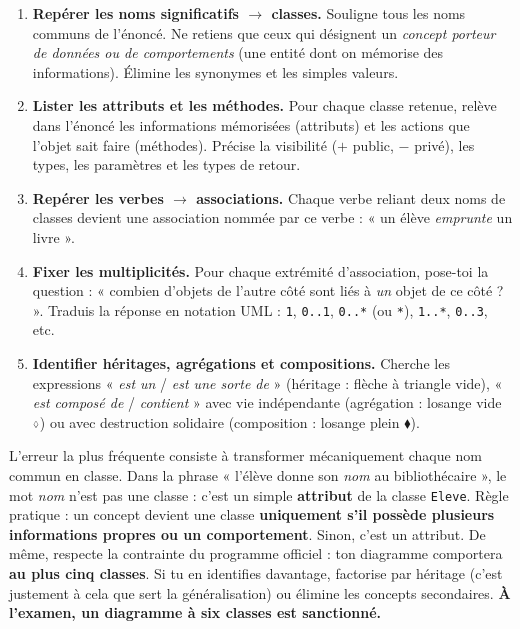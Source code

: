 \documentclass[11pt]{article}
\def\diamond{\mathbin{\scalebox{0.6}{$\Diamond$}}}%
\begin{document}
\begin{methode}
\begin{enumerate}
  \item \textbf{Repérer les noms significatifs $\rightarrow$ classes.} Souligne tous les noms communs de l'énoncé. Ne retiens que ceux qui désignent un \emph{concept porteur de données ou de comportements} (une entité dont on mémorise des informations). Élimine les synonymes et les simples valeurs.
  \item \textbf{Lister les attributs et les méthodes.} Pour chaque classe retenue, relève dans l'énoncé les informations mémorisées (attributs) et les actions que l'objet sait faire (méthodes). Précise la visibilité ($+$ public, $-$ privé), les types, les paramètres et les types de retour.
  \item \textbf{Repérer les verbes $\rightarrow$ associations.} Chaque verbe reliant deux noms de classes devient une association nommée par ce verbe : « un élève \emph{emprunte} un livre ».
  \item \textbf{Fixer les multiplicités.} Pour chaque extrémité d'association, pose-toi la question : « combien d'objets de l'autre côté sont liés à \emph{un} objet de ce côté ? ». Traduis la réponse en notation UML : \texttt{1}, \texttt{0..1}, \texttt{0..*} (ou \texttt{*}), \texttt{1..*}, \texttt{0..3}, etc.
  \item \textbf{Identifier héritages, agrégations et compositions.} Cherche les expressions « \emph{est un} / \emph{est une sorte de} » (héritage : flèche à triangle vide), « \emph{est composé de} / \emph{contient} » avec vie indépendante (agrégation : losange vide $\diamond$) ou avec destruction solidaire (composition : losange plein $\blacklozenge$).
\end{enumerate}
\end{methode}

\begin{attention}
L'erreur la plus fréquente consiste à transformer mécaniquement chaque nom commun en classe. Dans la phrase « l'élève donne son \emph{nom} au bibliothécaire », le mot \emph{nom} n'est pas une classe : c'est un simple \textbf{attribut} de la classe \texttt{Eleve}. Règle pratique : un concept devient une classe \textbf{uniquement s'il possède plusieurs informations propres ou un comportement}. Sinon, c'est un attribut. De même, respecte la contrainte du programme officiel : ton diagramme comportera \textbf{au plus cinq classes}. Si tu en identifies davantage, factorise par héritage (c'est justement à cela que sert la généralisation) ou élimine les concepts secondaires. \textbf{À l'examen, un diagramme à six classes est sanctionné.}
\end{attention}
\end{document}
